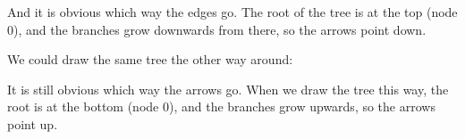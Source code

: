 \documentclass[../../../main.tex]{subfiles}
\begin{document}
\noindent
And it is obvious which way the edges go. The root of the tree is at the top (node 0), and the branches grow downwards from there, so the arrows point down.

We could draw the same tree the other way around:

\begin{center}
\end{center}

\noindent
It is still obvious which way the arrows go. When we draw the tree this way, the root is at the bottom (node 0), and the branches grow upwards, so the arrows point up.
\end{document}

